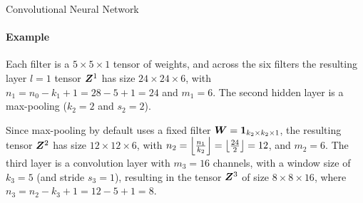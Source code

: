 \begin{frame}{Convolutional Neural Network}
\framesubtitle{Example}

\vspace*{-0.3cm}

    Each filter
    is a $5 \times 5 \times 1$ tensor of weights, and across the six
    filters the resulting
    layer $l=1$ tensor ${\boldsymbol Z}^1$ has size $24 \times 24 \times 6$, with $n_1 = n_0
    - k_1 +1 = 28-5+1 = 24$ and $m_1 = 6$.
	The second hidden layer is a max-pooling ($k_2=2$ and 
	$s_2=2$). 


\medskip

    Since max-pooling by default uses a fixed filter ${\boldsymbol W} =
    \mathbf{1}_{k_2 \times k_2 \times 1}$, the resulting
    tensor ${\boldsymbol Z}^2$ has size $12 \times 12 \times 6$, with $n_2 =
    \left\lfloor \tfrac{n_1}{k_2} \right\rfloor = 
    \left\lfloor\tfrac{24}{2}\right\rfloor = 12$, and $m_2 = 6$.
    The third
    layer is a convolution layer with $m_3 =16$ channels, with a
    window size of $k_3=5$ (and stride $s_3=1$), 
    resulting in the
    tensor ${\boldsymbol Z}^3$ of size $8 \times 8 \times 16$, where $n_3 = n_2 -
    k_3 + 1 = 12-5+1 = 8$.


\end{frame}
